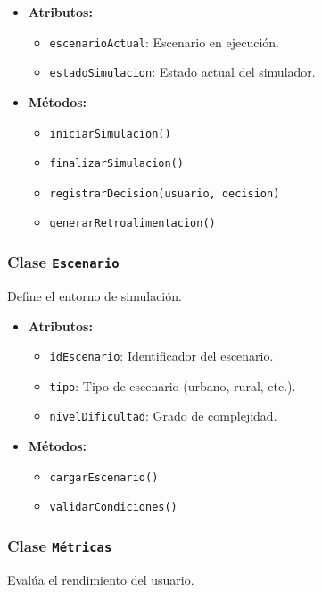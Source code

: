 \documentclass[12pt]{article}
\begin{document}
	\begin{itemize}
		\item \textbf{Atributos:}
		\begin{itemize}
			\item \texttt{escenarioActual}: Escenario en ejecución.
			\item \texttt{estadoSimulacion}: Estado actual del simulador.
		\end{itemize}
		\item \textbf{Métodos:}
		\begin{itemize}
			\item \texttt{iniciarSimulacion()}
			\item \texttt{finalizarSimulacion()}
			\item \texttt{registrarDecision(usuario, decision)}
			\item \texttt{generarRetroalimentacion()}
		\end{itemize}
	\end{itemize}
	
	\subsubsection*{Clase \texttt{Escenario}}
	Define el entorno de simulación.
	
	\begin{itemize}
		\item \textbf{Atributos:}
		\begin{itemize}
			\item \texttt{idEscenario}: Identificador del escenario.
			\item \texttt{tipo}: Tipo de escenario (urbano, rural, etc.).
			\item \texttt{nivelDificultad}: Grado de complejidad.
		\end{itemize}
		\item \textbf{Métodos:}
		\begin{itemize}
			\item \texttt{cargarEscenario()}
			\item \texttt{validarCondiciones()}
		\end{itemize}
	\end{itemize}
	
	\subsubsection*{Clase \texttt{Métricas}}
	Evalúa el rendimiento del usuario.
	
\end{document}
